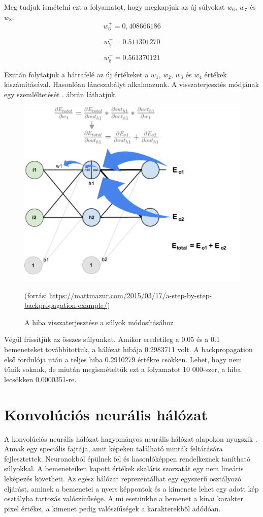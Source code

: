 Meg tudjuk ismételni ezt a folyamatot, hogy megkapjuk az új súlyokat $w_6$, $w_7$ és $w_8$:
$$
w_6 ^ {+} = 0,408666186
$$

$$
w_7 ^ {+} = 0.511301270
$$

$$
w_8 ^ {+} = 0.561370121
$$

Ezután folytatjuk a hátrafelé az új értékeket a $w_1$, $w_2$, $w_3$ és $w_4$ értékek kiszámításával. Hasonlóan láncszabályt alkalmazunk. A visszaterjesztés módjának egy szemléltetését . ábrán láthatjuk.

\begin{figure}[h]
\centering
\includegraphics[scale=0.5]{images/ANN_bp_viz}
\caption{A hiba visszaterjesztése a súlyok módosításához}
\label{fig:ANN_bp_viz}
(forrás: \url{https://mattmazur.com/2015/03/17/a-step-by-step-backpropagation-example/})
\end{figure}

Végül frissítjük az összes súlyunkat. Amikor eredetileg a 0.05 és a 0.1 bemeneteket továbbítottuk, a hálózat hibája 0.2983711 volt. A backpropagation első fordulója után a teljes hiba 0.2910279 értékre csökken. Lehet, hogy nem tűnik soknak, de miután megismételtük ezt a folyamatot 10 000-szer, a hiba lecsökken 0.0000351-re.

\section{Konvolúciós neurális hálózat}

A konvolúciós neurális hálózat hagyományos neurális hálózat alapokon nyugszik \cite{liconvolution}. Annak egy speciális fajtája, amit képeken található minták feltárására fejlesztettek. Neuronokból épülnek fel és hasonlóképpen rendelkeznek tanítható súlyokkal. A bemeneteiken kapott értékek skaláris szorzatát egy nem lineáris leképezés követheti. Az egész hálózat reprezentálhat egy egyszerű osztályozó eljárást, aminek a bemenetei a nyers képpontok és a kimenete lehet egy adott kép osztályba tartozás valószínűsége. A mi esetünkbe a bemenet a kínai karakter pixel értékei, a kimenet pedig valószíűségek a karakterekből adódóan.


